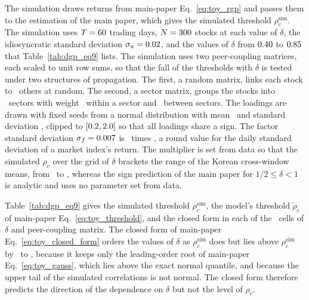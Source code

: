 \documentclass[a4paper,fleqn]{cas-sc}
\begin{document}
The simulation draws returns from main-paper Eq.~\eqref{eq:toy_rgp} and passes them to the estimation of the main paper, which gives the simulated threshold $\rho_c^{\mathrm{sim}}$. The simulation uses $T = 60$ trading days, $N = 300$ stocks at each value of $\delta$, the idiosyncratic standard deviation $\sigma_u = 0.02$, and the values of $\delta$ from $0.40$ to $0.85$ that Table~\ref{tab:dgp_eq9} lists. The simulation uses two peer-coupling matrices, each scaled to unit row sums, so that the fall of the thresholds with $\delta$ is tested under two structures of propagation. The first, a random matrix, links each stock to \dgpKnnK\ others at random. The second, a sector matrix, groups the stocks into \dgpNSectors\ sectors with weight \dgpIntraWeight\ within a sector and \dgpInterWeight\ between sectors. The loadings are drawn with fixed seeds from a normal distribution with mean \dgpBetaMean\ and standard deviation \dgpBetaStd, clipped to $[0.2, 2.0]$ so that all loadings share a sign. The factor standard deviation $\sigma_f = 0.007$ is \dgpSigmaFScale\ times \dgpSigmaFUnscaled, a round value for the daily standard deviation of a market index's return. The multiplier is set from data so that the simulated $\rho_c$ over the grid of $\delta$ brackets the range of the Korean cross-window means, from \barRhoCQone\ to \barRhoCQfive, whereas the sign prediction of the main paper for $1/2 \leq \delta < 1$ is analytic and uses no parameter set from data.

\label{si:eq9_verification}Table~\ref{tab:dgp_eq9} gives the simulated threshold $\rho_c^{\mathrm{sim}}$, the model's threshold $\tilde\rho_c$ of main-paper Eq.~\eqref{eq:toy_threshold}, and the closed form in each of the \nDgpEqEightCells\ cells of $\delta$ and peer-coupling matrix. The closed form of main-paper Eq.~\eqref{eq:toy_closed_form} orders the values of $\delta$ as $\rho_c^{\mathrm{sim}}$ does but lies above $\rho_c^{\mathrm{sim}}$ by \dgpEqNineOvershootLo\ to \dgpEqNineOvershootHi, because it keeps only the leading-order root of main-paper Eq.~\eqref{eq:toy_gauss}, which lies above the exact normal quantile, and because the upper tail of the simulated correlations is not normal. The closed form therefore predicts the direction of the dependence on $\delta$ but not the level of $\rho_c$.
\end{document}
